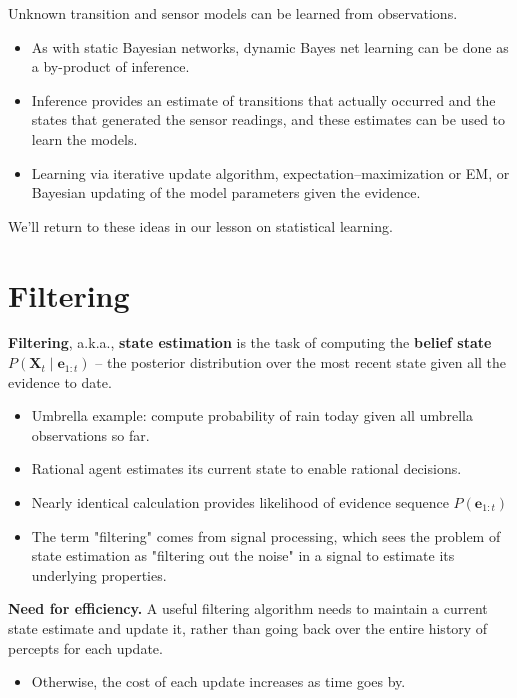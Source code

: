 \documentclass[11pt]{article}
\begin{document}
Unknown transition and sensor models can be learned from observations.

\begin{itemize}
\item As with static Bayesian networks, dynamic Bayes net learning can be done as a by-product of inference.

\item Inference provides an estimate of transitions that actually occurred and the states that generated the sensor readings, and these estimates can be used to learn the models.

\item Learning via iterative update algorithm, expectation–maximization or EM, or Bayesian updating of the model parameters given the evidence.
\end{itemize}

We'll return to these ideas in our lesson on statistical learning.
\section{Filtering}
\label{sec:org89665b7}

\textbf{Filtering}, a.k.a., \textbf{state estimation} is the task of computing the \textbf{belief state} \(P(\bm{X}_t \mid \bm{e}_{1:t})\) -- the posterior distribution over the most recent state given all the evidence to date.

\begin{itemize}
\item Umbrella example: compute probability of rain today given all umbrella observations so far.
\item Rational agent estimates its current state to enable rational decisions.
\item Nearly identical calculation provides likelihood of evidence sequence \(P(\bm{e}_{1:t})\)
\item The term "filtering" comes from signal processing, which sees the problem of state estimation as "filtering out the noise" in a signal to estimate its underlying properties.
\end{itemize}

\textbf{Need for efficiency.} A useful filtering algorithm needs to maintain a current state estimate and update it, rather than going back over the entire history of percepts for each update.

\begin{itemize}
\item Otherwise, the cost of each update increases as time goes by.
\end{itemize}
\end{document}
